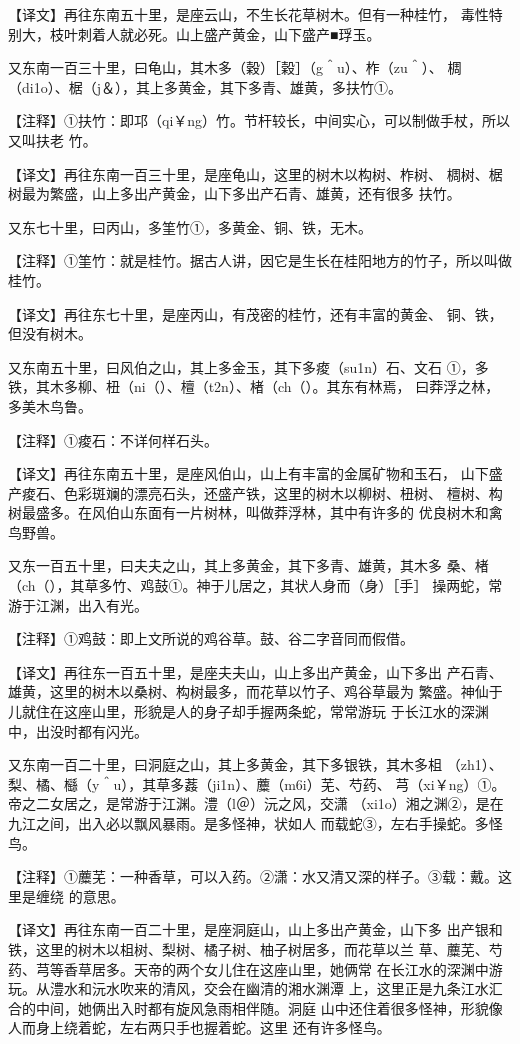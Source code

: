 \documentclass[a4paper,12pt,UTF8,twoside]{ctexbook}
\begin{document}
【译文】再往东南五十里，是座云山，不生长花草树木。但有一种桂竹， 毒性特别大，枝叶刺着人就必死。山上盛产黄金，山下盛产■琈玉。

又东南一百三十里，曰龟山，其木多（穀）［榖］（g＾u）、柞（zu＾）、 椆（di1o）、椐（j＆），其上多黄金，其下多青、雄黄，多扶竹①。

【注释】①扶竹：即邛（qi￥ng）竹。节杆较长，中间实心，可以制做手杖，所以又叫扶老 竹。

【译文】再往东南一百三十里，是座龟山，这里的树木以构树、柞树、 椆树、椐树最为繁盛，山上多出产黄金，山下多出产石青、雄黄，还有很多 扶竹。

又东七十里，曰丙山，多筀竹①，多黄金、铜、铁，无木。

【注释】①筀竹：就是桂竹。据古人讲，因它是生长在桂阳地方的竹子，所以叫做桂竹。

【译文】再往东七十里，是座丙山，有茂密的桂竹，还有丰富的黄金、 铜、铁，但没有树木。

又东南五十里，曰风伯之山，其上多金玉，其下多痠（su1n）石、文石 ①，多铁，其木多柳、杻（ni（）、檀（t2n）、楮（ch（）。其东有林焉， 曰莽浮之林，多美木鸟鲁。

【注释】①痠石：不详何样石头。

【译文】再往东南五十里，是座风伯山，山上有丰富的金属矿物和玉石， 山下盛产痠石、色彩斑斓的漂亮石头，还盛产铁，这里的树木以柳树、杻树、 檀树、构树最盛多。在风伯山东面有一片树林，叫做莽浮林，其中有许多的 优良树木和禽鸟野兽。

又东一百五十里，曰夫夫之山，其上多黄金，其下多青、雄黄，其木多 桑、楮（ch（），其草多竹、鸡鼓①。神于儿居之，其状人身而（身）［手］ 操两蛇，常游于江渊，出入有光。

【注释】①鸡鼓：即上文所说的鸡谷草。鼓、谷二字音同而假借。

【译文】再往东一百五十里，是座夫夫山，山上多出产黄金，山下多出 产石青、雄黄，这里的树木以桑树、构树最多，而花草以竹子、鸡谷草最为 繁盛。神仙于儿就住在这座山里，形貌是人的身子却手握两条蛇，常常游玩 于长江水的深渊中，出没时都有闪光。

又东南一百二十里，曰洞庭之山，其上多黄金，其下多银铁，其木多柤 （zh1）、梨、橘、櫾（y＾u），其草多葌（ji1n）、蘪（m6i）芜、芍药、 芎（xi￥ng）①。帝之二女居之，是常游于江渊。澧（l＠）沅之风，交潇 （xi1o）湘之渊②，是在九江之间，出入必以飘风暴雨。是多怪神，状如人 而载蛇③，左右手操蛇。多怪鸟。

【注释】①蘪芜：一种香草，可以入药。②潇：水又清又深的样子。③载：戴。这里是缠绕 的意思。

【译文】再往东南一百二十里，是座洞庭山，山上多出产黄金，山下多 出产银和铁，这里的树木以柤树、梨树、橘子树、柚子树居多，而花草以兰 草、蘪芜、芍药、芎等香草居多。天帝的两个女儿住在这座山里，她俩常 在长江水的深渊中游玩。从澧水和沅水吹来的清风，交会在幽清的湘水渊潭 上，这里正是九条江水汇合的中间，她俩出入时都有旋风急雨相伴随。洞庭 山中还住着很多怪神，形貌像人而身上绕着蛇，左右两只手也握着蛇。这里 还有许多怪鸟。
\end{document}
